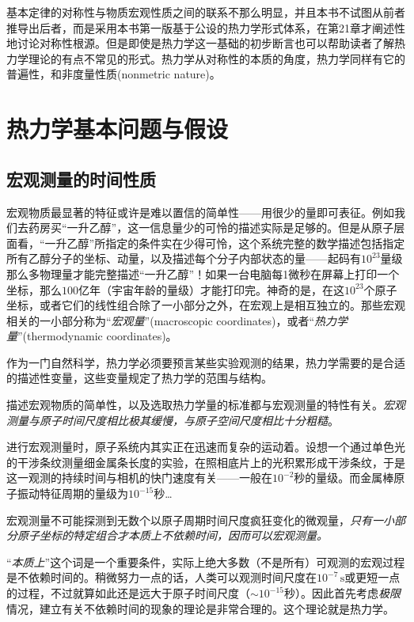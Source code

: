 基本定律的对称性与物质宏观性质之间的联系不那么明显，并且本书不试图从前者推导出后者，而是采用本书第一版基于公设的热力学形式体系，在第21章才阐述性地讨论对称性根源。但是即使是热力学这一基础的初步断言也可以帮助读者了解热力学理论的有点不常见的形式。热力学从对称性的本质的角度，热力学同样有它的普遍性，和非度量性质(nonmetric nature)。



\chapter{热力学基本问题与假设}
\label{chap1}
\section{宏观测量的时间性质}
\label{sec1.1}
宏观物质最显著的特征或许是难以置信的简单性——用很少的量即可表征。例如我们去药房买“一升乙醇”，这一信息量少的可怜的描述实际是足够的。但是从原子层面看，“一升乙醇”所指定的条件实在少得可怜，这个系统完整的数学描述包括指定所有乙醇分子的坐标、动量，以及描述每个分子内部状态的量——起码有$10^{23}$量级那么多物理量才能完整描述“一升乙醇”！如果一台电脑每1微秒在屏幕上打印一个坐标，那么$100$亿年（宇宙年龄的量级）才能打印完。神奇的是，在这$10^{23}$个原子坐标，或者它们的线性组合除了一小部分之外，在宏观上是相互独立的。那些宏观相关的一小部分称为“{\it 宏观量}”(macroscopic coordinates)，或者“{\it 热力学量}”(thermodynamic coordinates)。

作为一门自然科学，热力学必须要预言某些实验观测的结果，热力学需要的是合适的描述性变量，这些变量规定了热力学的范围与结构。

描述宏观物质的简单性，以及选取热力学量的标准都与宏观测量的特性有关。{\it 宏观测量与原子时间尺度相比极其缓慢，与原子空间尺度相比十分粗糙}。

进行宏观测量时，原子系统内其实正在迅速而复杂的运动着。设想一个通过单色光的干涉条纹测量细金属条长度的实验，在照相底片上的光积累形成干涉条纹，于是这一观测的持续时间与相机的快门速度有关——一般在$10^{-2}$秒的量级。而金属棒原子振动特征周期的量级为$10^{-15}$秒…

宏观测量不可能探测到无数个以原子周期时间尺度疯狂变化的微观量，{\it 只有一小部分原子坐标的特定组合才本质上不依赖时间，因而可以宏观测量。}

“{\it 本质上}”这个词是一个重要条件，实际上绝大多数（不是所有）可观测的宏观过程是不依赖时间的。稍微努力一点的话，人类可以观测时间尺度在$10^{-7}\, \mathrm{s}$或更短一点的过程，不过就算如此还是远大于原子时间尺度（$\sim 10^{-15}$秒）。因此首先考虑{\it 极限}情况，建立有关不依赖时间的现象的理论是非常合理的。这个理论就是热力学。

